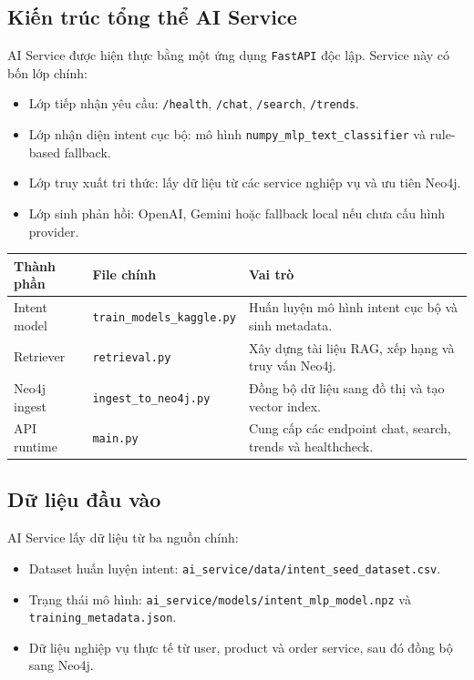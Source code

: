 \documentclass[12pt,a4paper]{article}
\begin{document}
\subsection{Kiến trúc tổng thể AI Service}
AI Service được hiện thực bằng một ứng dụng \texttt{FastAPI} độc lập. Service này có bốn lớp chính:
\begin{itemize}
  \item Lớp tiếp nhận yêu cầu: \texttt{/health}, \texttt{/chat}, \texttt{/search}, \texttt{/trends}.
  \item Lớp nhận diện intent cục bộ: mô hình \texttt{numpy\_mlp\_text\_classifier} và rule-based fallback.
  \item Lớp truy xuất tri thức: lấy dữ liệu từ các service nghiệp vụ và ưu tiên Neo4j.
  \item Lớp sinh phản hồi: OpenAI, Gemini hoặc fallback local nếu chưa cấu hình provider.
\end{itemize}

\begin{longtable}{p{3.6cm}p{4.2cm}p{5.8cm}}
\toprule
\textbf{Thành phần} & \textbf{File chính} & \textbf{Vai trò} \\
\midrule
Intent model & \texttt{train\_models\_kaggle.py} & Huấn luyện mô hình intent cục bộ và sinh metadata. \\
Retriever & \texttt{retrieval.py} & Xây dựng tài liệu RAG, xếp hạng và truy vấn Neo4j. \\
Neo4j ingest & \texttt{ingest\_to\_neo4j.py} & Đồng bộ dữ liệu sang đồ thị và tạo vector index. \\
API runtime & \texttt{main.py} & Cung cấp các endpoint chat, search, trends và healthcheck. \\
\bottomrule
\end{longtable}

\subsection{Dữ liệu đầu vào}
AI Service lấy dữ liệu từ ba nguồn chính:
\begin{itemize}
  \item Dataset huấn luyện intent: \texttt{ai\_service/data/intent\_seed\_dataset.csv}.
  \item Trạng thái mô hình: \texttt{ai\_service/models/intent\_mlp\_model.npz} và \texttt{training\_metadata.json}.
  \item Dữ liệu nghiệp vụ thực tế từ user, product và order service, sau đó đồng bộ sang Neo4j.
\end{itemize}
\end{document}

